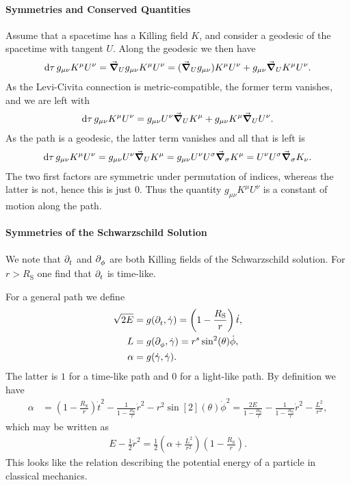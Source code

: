 \paragraph{Symmetries and Conserved Quantities}
Assume that a spacetime has a Killing field $K$, and consider a geodesic of the spacetime with tangent $U$. Along the geodesic we then have
\begin{align*}
	\dd{\tau}g_{\mu\nu}K^{\mu}U^{\nu} = \grad_{U}{g_{\mu\nu}K^{\mu}U^{\nu}} = (\grad_{U}{g_{\mu\nu}})K^{\mu}U^{\nu} + g_{\mu\nu}\grad_{U}{K^{\mu}U^{\nu}}.
\end{align*}
As the Levi-Civita connection is metric-compatible, the former term vanishes, and we are left with
\begin{align*}
	\dd{\tau}g_{\mu\nu}K^{\mu}U^{\nu} = g_{\mu\nu}U^{\nu}\grad_{U}{K^{\mu}} + g_{\mu\nu}K^{\mu}\grad_{U}{U^{\nu}}.
\end{align*}
As the path is a geodesic, the latter term vanishes and all that is left is
\begin{align*}
	\dd{\tau}g_{\mu\nu}K^{\mu}U^{\nu} = g_{\mu\nu}U^{\nu}\grad_{U}{K^{\mu}} = g_{\mu\nu}U^{\nu}U^{\sigma}\grad_{\sigma}{K^{\mu}} = U^{\nu}U^{\sigma}\grad_{\sigma}{K_{\nu}}.
\end{align*}
The two first factors are symmetric under permutation of indices, whereas the latter is not, hence this is just $0$. Thus the quantity $g_{\mu\nu}K^{\mu}U^{\nu}$ is a constant of motion along the path.

\paragraph{Symmetries of the Schwarzschild Solution}
We note that $\partial^{}_{t}$ and $\partial^{}_{\phi}$ are both Killing fields of the Schwarzschild solution. For $r > R_{\text{S}}$ one find that $\partial^{}_{t}$ is time-like.

For a general path we define
\begin{align*}
	\sqrt{2E} &= g(\partial^{}_{t}, \dot{\gamma}) = \left(1 - \frac{R_{\text{S}}}{r}\right)\dot{t}, \\
	L         &= g(\partial^{}_{\phi}, \dot{\gamma}) = r^{s}\sin[2](\theta)\dot{\phi}, \\
	\alpha    &= g(\dot{\gamma}, \dot{\gamma}).
\end{align*}
The latter is $1$ for a time-like path and $0$ for a light-like path. By definition we have
\begin{align*}
	\alpha &= \left(1 - \frac{R_{\text{S}}}{r}\right)\dot{t}^{2} - \frac{1}{1 - \frac{R_{\text{S}}}{r}}\dot{r}^{2} - r^{2}\sin[2](\theta)\dot{\phi}^{2} = \frac{2E}{1 - \frac{R_{\text{S}}}{r}} - \frac{1}{1 - \frac{R_{\text{S}}}{r}}\dot{r}^{2} - \frac{L^{2}}{r^{2}},
\end{align*}
which may be written as
\begin{align*}
	E - \frac{1}{2}\dot{r}^{2} = \frac{1}{2}\left(\alpha + \frac{L^{2}}{r^{2}}\right)\left(1 - \frac{R_{\text{S}}}{r}\right).
\end{align*}
This looks like the relation describing the potential energy of a particle in classical mechanics.